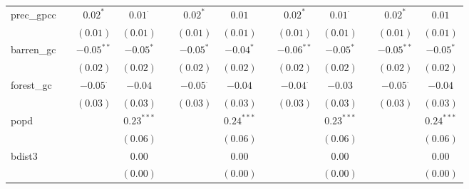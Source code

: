 \begin{sidewaystable}
\begin{center}
{\begin{tabular}{l c c c c c c c c c c c c}
prec\_gpcc          &               & $0.02^{*}$      & $0.01^{\cdot}$  &               & $0.02^{*}$      & $0.01$          &                 & $0.02^{*}$      & $0.01^{\cdot}$  &                 & $0.02^{*}$      & $0.01$          \\
                    &               & $(0.01)$        & $(0.01)$        &               & $(0.01)$        & $(0.01)$        &                 & $(0.01)$        & $(0.01)$        &                 & $(0.01)$        & $(0.01)$        \\
barren\_gc          &               & $-0.05^{**}$    & $-0.05^{*}$     &               & $-0.05^{*}$     & $-0.04^{*}$     &                 & $-0.06^{**}$    & $-0.05^{*}$     &                 & $-0.05^{**}$    & $-0.05^{*}$     \\
                    &               & $(0.02)$        & $(0.02)$        &               & $(0.02)$        & $(0.02)$        &                 & $(0.02)$        & $(0.02)$        &                 & $(0.02)$        & $(0.02)$        \\
forest\_gc          &               & $-0.05^{\cdot}$ & $-0.04$         &               & $-0.05^{\cdot}$ & $-0.04$         &                 & $-0.04^{\cdot}$ & $-0.03$         &                 & $-0.05^{\cdot}$ & $-0.04$         \\
                    &               & $(0.03)$        & $(0.03)$        &               & $(0.03)$        & $(0.03)$        &                 & $(0.03)$        & $(0.03)$        &                 & $(0.03)$        & $(0.03)$        \\
popd                &               &                 & $0.23^{***}$    &               &                 & $0.24^{***}$    &                 &                 & $0.23^{***}$    &                 &                 & $0.24^{***}$    \\
                    &               &                 & $(0.06)$        &               &                 & $(0.06)$        &                 &                 & $(0.06)$        &                 &                 & $(0.06)$        \\
bdist3              &               &                 & $0.00$          &               &                 & $0.00$          &                 &                 & $0.00$          &                 &                 & $0.00$          \\
                    &               &                 & $(0.00)$        &               &                 & $(0.00)$        &                 &                 & $(0.00)$        &                 &                 & $(0.00)$        \\

\end{tabular}}
\end{center}
\end{sidewaystable}
